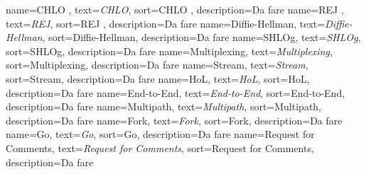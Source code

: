  {
    name=CHLO ,
    text=\emph{CHLO},
    sort=CHLO ,
    description={Da fare}
}
 {
    name=REJ ,
    text=\emph{REJ},
    sort=REJ ,
    description={Da fare}
}
 {
    name=Diffie-Hellman,
    text=\emph{Diffie-Hellman},
    sort=Diffie-Hellman,
    description={Da fare}
}
 {
    name=SHLOg,
    text=\emph{SHLOg},
    sort=SHLOg,
    description={Da fare}
}
 {
    name=Multiplexing,
    text=\emph{Multiplexing},
    sort=Multiplexing,
    description={Da fare}
}
 {
    name=Stream,
    text=\emph{Stream},
    sort=Stream,
    description={Da fare}
}
 {
    name=HoL,
    text=\emph{HoL},
    sort=HoL,
    description={Da fare}
}
 {
    name=End-to-End,
    text=\emph{End-to-End},
    sort=End-to-End,
    description={Da fare}
}
 {
    name=Multipath,
    text=\emph{Multipath},
    sort=Multipath,
    description={Da fare}
}
 {
    name=Fork,
    text=\emph{Fork},
    sort=Fork,
    description={Da fare}
}
 {
    name=Go,
    text=\emph{Go},
    sort=Go,
    description={Da fare}
}
 {
    name=Request for Comments,
    text=\emph{Request for Comments},
    sort=Request for Comments,
    description={Da fare}
}